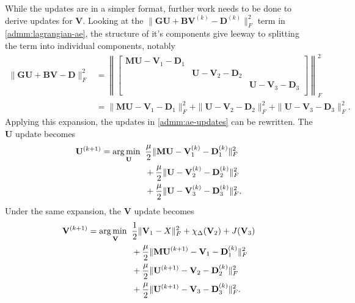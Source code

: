 While the updates are in a simpler format, further work needs to be done to derive updates for $\mathbf{V}$. Looking at the $\|\mathbf{GU} + \mathbf{BV}^{(k)} - \mathbf{D}^{(k)}\|_F^2$ term in \eqref{admm:lagrangian-ae}, the structure of it's components give leeway to splitting the term into individual components, notably
\begin{equation*}
  \begin{aligned}
    \|\mathbf{GU} + \mathbf{BV} - \mathbf{D}\|_F^2 &= 
    \left\lVert
    \begin{bmatrix}
    \mathbf{MU} - \mathbf{V}_1 - \mathbf{D}_1 &  &  \\
      &\mathbf{U} - \mathbf{V}_2 - \mathbf{D}_2&  \\
    &  & \mathbf{U} - \mathbf{V}_3 - \mathbf{D}_3 \\
    \end{bmatrix}
    \right\rVert^2_F \\
    &= \|\mathbf{MU} - \mathbf{V}_1 - \mathbf{D}_1\|_F^2 +
       \|\mathbf{U} - \mathbf{V}_2 - \mathbf{D}_2\|_F^2 +
       \|\mathbf{U} - \mathbf{V}_3 - \mathbf{D}_3\|_F^2.
  \end{aligned}
\end{equation*}
Applying this expansion, the updates in \eqref{admm:ae-updates} can be rewritten. The $\mathbf{U}$ update becomes
\begin{equation}
  \label{admm:ae-updates-u}
  \begin{aligned}
    \mathbf{U}^{(k+1)} = \operatorname*{arg\,min \;\;}_{\mathbf{U}}  & 
    \frac{\mu}{2} \|\mathbf{MU} - \mathbf{V}_1^{(k)} - \mathbf{D}_1^{(k)}\|_F^2 \\
    & + \frac{\mu}{2} \|\mathbf{U} - \mathbf{V}_2^{(k)} - \mathbf{D}_2^{(k)}\|_F^2 \\
    & + \frac{\mu}{2} \|\mathbf{U} - \mathbf{V}_3^{(k)} - \mathbf{D}_3^{(k)}\|_F^2.
  \end{aligned}
\end{equation}
Under the same expansion, the $\mathbf{V}$ update becomes
\begin{equation*}
  \begin{aligned}
    \mathbf{V}^{(k+1)} = \operatorname*{arg\,min \;\;}_{\mathbf{V}}  &  \frac{1}{2} \|\mathbf{V}_1 - X \|_F^2 + \chi_{\Delta}(\mathbf{V}_2) + J(\mathbf{V}_3) \\ 
    & + \frac{\mu}{2} \|\mathbf{MU}^{(k+1)} - \mathbf{V}_1 - \mathbf{D}_1^{(k)}\|_F^2 \\
    & + \frac{\mu}{2} \|\mathbf{U}^{(k+1)} - \mathbf{V}_2 - \mathbf{D}_2^{(k)}\|_F^2 \\
    & + \frac{\mu}{2} \|\mathbf{U}^{(k+1)} - \mathbf{V}_3 - \mathbf{D}_3^{(k)}\|_F^2.
  \end{aligned}
\end{equation*}
